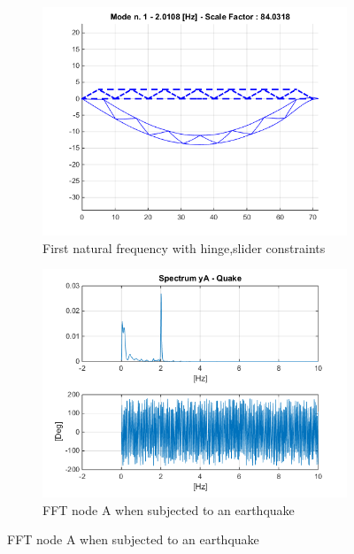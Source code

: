 \documentclass[10pt,a4paper,final]{report}
\begin{document}
\begin{figure}[h]
        \centering
        \begin{subfigure}[t]{0.5\textwidth}
                \includegraphics[width=\textwidth]{bridgelast0}
                \caption{First natural frequency with hinge,slider constraints}
                \label{fig:last1}
        \end{subfigure}%
        \begin{subfigure}[t]{0.5\textwidth}
                \includegraphics[width=\textwidth]{bridgelast01}
                \caption{FFT node A when subjected to an earthquake}
                \label{fig:last2}
        \end{subfigure}
         \label{fig:lasta}
\end{figure}
\end{document}
